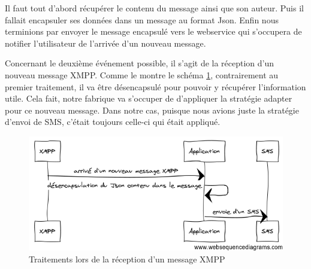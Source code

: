 Il faut tout d'abord récupérer le contenu du message ainsi que son auteur. Puis il fallait encapsuler 
ses données dans un message au format Json. Enfin nous terminions par envoyer le message encapsulé vers 
le webservice qui s'occupera de notifier l'utilisateur de l'arrivée d'un nouveau message.

Concernant le deuxième événement possible, il s'agit de la réception d'un nouveau message XMPP. Comme le
montre le schéma \ref{desencapsulation}, contrairement au premier traitement, il va être désencapsulé pour 
pouvoir y récupérer l'information utile. Cela fait, notre fabrique va s'occuper de d'appliquer la stratégie 
adapter pour ce nouveau message. Dans notre cas, puisque nous avions juste la stratégie d'envoi de SMS, c'était toujours celle-ci qui était appliqué.


\begin{figure}[!h]
	\center
	\includegraphics[width=12cm]{img/desencapsulation.png}
	\caption{Traitements lors de la réception d'un message XMPP}
	\label{desencapsulation}
\end{figure}